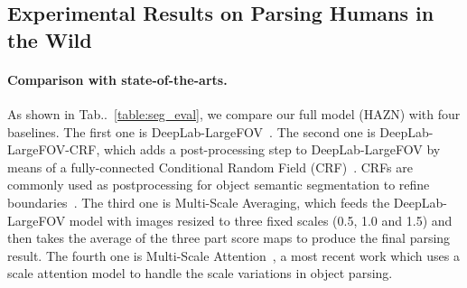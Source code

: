 \documentclass[runningheads]{llncs}
\makeatletter
\newcommand{\tabref}[1]{Tab\onedot~\ref{#1}}
\DeclareRobustCommand\onedot{\futurelet\@let@token\@onedot}
\def\@onedot{\ifx\@let@token.\else.\null\fi\xspace}
\makeatother
\begin{document}
\subsection{Experimental Results on Parsing Humans in the Wild}
\label{subsec:human_parsing}
\begin{table}[!t]
  \centering
\setlength{\tabcolsep}{5pt}
\caption{Part parsing accuracy (\%) on PASCAL-Person-Part in terms of mean IOU. We compare our full model (HAZN) with two sub-models and four state-of-the-art baselines.}
\label{table:seg_eval}
\vspace{-1.7\baselineskip}
\end{table}

\paragraph{Comparison with state-of-the-arts.}
As shown in \tabref{table:seg_eval}, we compare our full model (HAZN) with four baselines. The first one is DeepLab-LargeFOV~\cite{chen2014semantic}. The second one is DeepLab-LargeFOV-CRF, which adds a post-processing step to DeepLab-LargeFOV by means of a fully-connected Conditional Random Field (CRF)~\cite{KrahenbuhlK11}. CRFs are commonly used as postprocessing for object semantic segmentation to refine boundaries~\cite{chen2014semantic}. The third one is Multi-Scale Averaging, which feeds the DeepLab-LargeFOV model with images resized to three fixed scales (0.5, 1.0 and 1.5) and then takes the average of the three part score maps to produce the final parsing result. The fourth one is Multi-Scale Attention~\cite{chen2015attention}, a most recent work which uses a scale attention model to handle the scale variations in object parsing.
\end{document}
